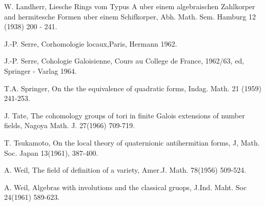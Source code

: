 \begin{thebibliography}{99}
 {W. Landherr}, Liesche Rings vom Typus A uber einem
  algebraischen Zahlkorper and hermitesche Formen uber einem
  Schifkorper, Abh. Math. Sem. Hamburg 12 (1938) 200 - 241. 

 {J.-P. Serre}, Corhomologie locaux,Paris, Hermann
  1962. 

 {J.-P. Serre}, Cohologie Galoisienne, Cours au
  College de France, 1962/63, ed, Springer - Varlag 1964. 

 {T.A. Springer}, On the the equivalence of quadratic
  forms, Indag. Math. 21 (1959) 241-253. 

 {J. Tate}, The cohomology groups of tori in finite
  Galois extensions of number fields, Nagoya Math. J. 27(1966)
  709-719. 

 {T. Tsukamoto}, On the local theory of quaternionic
  antihermitian forms, J, Math. Soc. Japan 13(1961), 387-400. 

 {A. Weil}, The field of definition of a variety,
  Amer.J. Math. 78(1956) 509-524. 

 {A. Weil}, Algebras with involutions and the classical
  gruops, J.Ind. Maht. Soc 24(1961) 589-623. 
\end{thebibliography}

